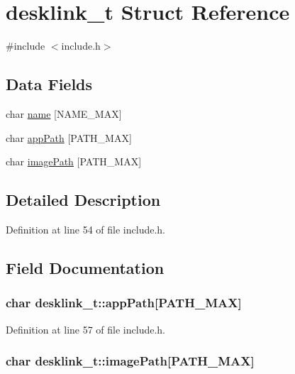 \hypertarget{structdesklink__t}{\section{desklink\-\_\-t Struct Reference}
\label{structdesklink__t}
}


{\ttfamily \#include $<$include.\-h$>$}

\subsection*{Data Fields}
\begin{DoxyCompactItemize}
\item 
char \hyperlink{structdesklink__t_aff78ef2e29eaf6152f7586605dff6feb}{name} \mbox{[}N\-A\-M\-E\-\_\-\-M\-A\-X\mbox{]}
\item 
char \hyperlink{structdesklink__t_aaf17b18d943c7240fca22ce5083334d8}{app\-Path} \mbox{[}P\-A\-T\-H\-\_\-\-M\-A\-X\mbox{]}
\item 
char \hyperlink{structdesklink__t_ab0de75054dd03a6b44b273ebd1323ae8}{image\-Path} \mbox{[}P\-A\-T\-H\-\_\-\-M\-A\-X\mbox{]}
\end{DoxyCompactItemize}


\subsection{Detailed Description}


Definition at line 54 of file include.\-h.



\subsection{Field Documentation}
\hypertarget{structdesklink__t_aaf17b18d943c7240fca22ce5083334d8}{
\subsubsection[{app\-Path}]{\setlength{\rightskip}{0pt plus 5cm}char desklink\-\_\-t\-::app\-Path\mbox{[}P\-A\-T\-H\-\_\-\-M\-A\-X\mbox{]}}}\label{structdesklink__t_aaf17b18d943c7240fca22ce5083334d8}


Definition at line 57 of file include.\-h.

\hypertarget{structdesklink__t_ab0de75054dd03a6b44b273ebd1323ae8}{
\subsubsection[{image\-Path}]{\setlength{\rightskip}{0pt plus 5cm}char desklink\-\_\-t\-::image\-Path\mbox{[}P\-A\-T\-H\-\_\-\-M\-A\-X\mbox{]}}}\label{structdesklink__t_ab0de75054dd03a6b44b273ebd1323ae8}


